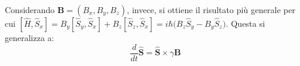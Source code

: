 \documentclass[10pt, a4paper]{scrartcl} %
\numberwithin{equation}{subsection}
\theoremstyle{style2}
\theoremstyle{style1}
\begin{document}
Considerando $\mathbf{B} = (B_x,B_y,B_z)$, invece, si ottiene il risultato pi\`u generale per cui $[\hat{H}, \hat{S}_x] = B_y [ \hat{S}_y , \hat{S}_x] + B_z [\hat{S}_z , \hat{S}_x] = i \hbar \big(B_z \hat{S}_y - B_y \hat{S}_z\big)$.
Questa si generalizza a:
\begin{equation}
	\frac{d }{d t} \hat{\mathbf{S} } = \hat{\mathbf{S} } \times  \gamma \mathbf{B} 
\end{equation}
\end{document}
